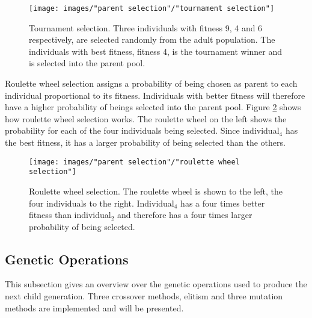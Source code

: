 \begin{figure}[h!]
\begin{center}
\texttt{[image: images/"parent selection"/"tournament selection"]}
\caption{Tournament selection. Three individuals with fitness 9, 4 and 6 respectively, are selected randomly from the adult population. The individuals with best fitness, fitness 4, is the tournament winner and is selected into the parent pool.}
\label{figure:tournament selection}
\end{center}
\end{figure}


\noindent Roulette wheel selection assigns a probability of being chosen as parent to each individual proportional to its fitness. Individuals with better fitness will therefore have a higher probability of beings selected into the parent pool. Figure \ref{figure:roulette wheel selection} shows how roulette wheel selection works. The roulette wheel on the left shows the probability for each of the four individuals being selected. Since individual$_4$ has the best fitness, it has a larger probability of being selected than the others. \\


\begin{figure}[h!]
\begin{center}
\texttt{[image: images/"parent selection"/"roulette wheel selection"]}
\caption{Roulette wheel selection. The roulette wheel is shown to the left, the four individuals to the right. Individual$_4$ has a four times better fitness than individual$_2$ and therefore has a four times larger probability of being selected.}
\label{figure:roulette wheel selection}
\end{center}
\end{figure}


\subsection{Genetic Operations}\label{subsection:genetic operations}
This subsection gives an overview over the genetic operations used to produce the next child generation. Three crossover methods, elitism and three mutation methods are implemented and will be presented. 


